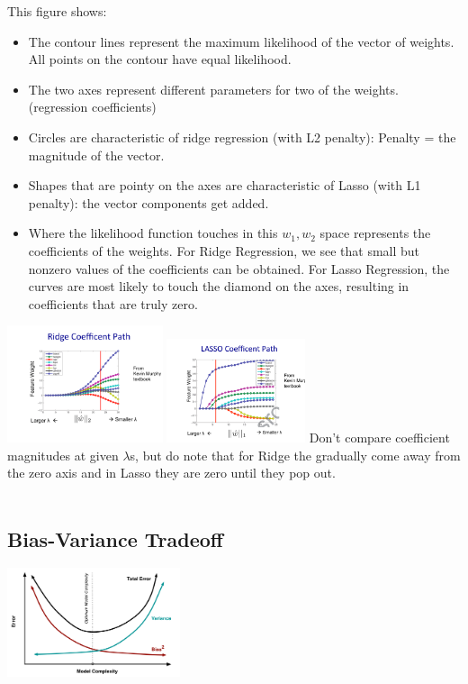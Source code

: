 This figure shows: 
\begin{itemize}
	\item The contour lines represent the maximum likelihood of the vector of weights.  
		All points on the contour have equal likelihood.
	\item The two axes represent different parameters for two of the weights.  (regression coefficients)
	\item Circles are characteristic of ridge regression (with L2 penalty): Penalty = the magnitude of the vector.
	\item Shapes that are pointy on the axes are characteristic of Lasso (with L1 penalty): the vector components get added. 
	\item Where the likelihood function touches in this $w_1, w_2$ space represents the coefficients of the weights.
		For Ridge Regression, we see that small but nonzero values of the coefficients can be obtained.
		For Lasso Regression, the curves are most likely to touch the diamond on the axes, 
		resulting in coefficients that are truly zero. 
\end{itemize} 

\includegraphics[width=1.8in]{figures/lambda_with_w2.pdf}  \includegraphics[width=1.6in]{figures/lambda_with_w1.pdf}
Don't compare coefficient magnitudes at given $\lambda$s, 
but do note that for Ridge the gradually come away from the zero axis and in Lasso they are zero until they pop out.   \hfill \\ \hfill \\

\subsection{Bias-Variance Tradeoff}
\includegraphics[width=2.0in]{figures/biasvariance.png} 

